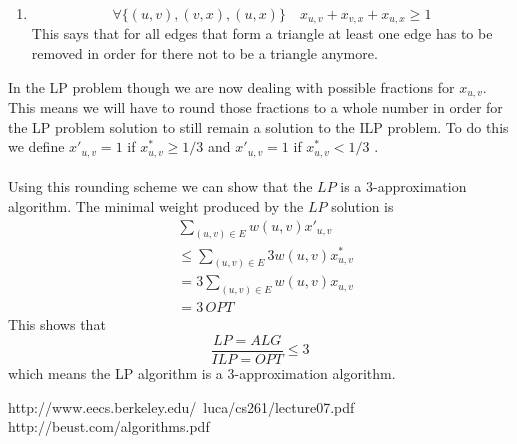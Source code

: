\documentclass[12pt]{article}
\begin{document}
\begin{enumerate}
\begin{enumerate}
    \item
     $$
     \forall\{(u,v),(v,x),(u,x)\} \quad x_{u,v} + x_{v,x} + x_{u,x} \ge 1
     $$
     This says that for all edges that form a triangle at least one edge has to
     be removed in order for there not to be a triangle anymore.  
  \end{enumerate}
  In the LP
  problem though we are now dealing with possible fractions for $x_{u,v}$. 
  This means we will have to round those fractions to a whole number in order
  for the LP problem solution to still remain a solution to the ILP problem.  
  To do this we define $x'_{u,v} = 1$ if $x^{*}_{u,v} \ge 1/3$ and $x'_{u,v}
  = 1$ if $x^{*}_{u,v} < 1/3$ \cite{1}.\\
  \\
  Using this rounding scheme we can show that the $LP$ is a 3-approximation
  algorithm.  The minimal weight produced by the $LP$ solution is
  \begin{align*}
  &\sum_{(u,v) \in E} w(u,v)x'_{u,v}\\
  &\le \sum_{(u,v) \in E} 3w(u,v)x^{*}_{u,v}\\
  &= 3\sum_{(u,v) \in E} w(u,v)x_{u,v}\\
  &= 3 \, OPT
  \end{align*}
  This shows that 
  $$
  \frac{LP=ALG}{ILP=OPT} \le 3
  $$
  which means the LP algorithm is a 3-approximation algorithm.
    
\end{enumerate}

\newpage
\begin{thebibliography}{2}
 http://www.eecs.berkeley.edu/~luca/cs261/lecture07.pdf
 http://beust.com/algorithms.pdf
\end{thebibliography}
\end{document}
